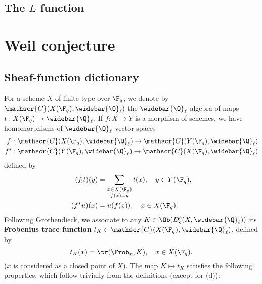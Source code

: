 \subsection{The \texorpdfstring{$L$}{L} function}

\section{Weil conjecture}
\subsection{Sheaf-function dictionary}\label{scheme sheaf-function dictionary subsection}
For a scheme $X$ of finite type over $\F_q$, we denote by $\mathscr{C}(X(\F_q),\widebar{\Q}_\ell)$ the $\widebar{\Q}_\ell$-algebra of maps $t:X(\F_q)\to\widebar{\Q}_\ell$. If $f:X\to Y$ is a morphism of schemes, we have homomorphisms of $\widebar{\Q}_\ell$-vector spaces
\begin{align*}
f_!&:\mathscr{C}(X(\F_q),\widebar{\Q}_\ell)\to \mathscr{C}(Y(\F_q),\widebar{\Q}_\ell)\\
f^*&:\mathscr{C}(Y(\F_q),\widebar{\Q}_\ell)\to \mathscr{C}(X(\F_q),\widebar{\Q}_\ell)
\end{align*}
defined by 
\begin{align*}
(f_!t)(y)&=\sum_{\substack{x\in X(\F_q)\\ f(x)=y}}t(x),\quad y\in Y(\F_q),\\
(f^*u)(x)&=u(f(x)),\quad x\in X(\F_q).
\end{align*}
Following Grothendieck, we associate to any $K\in\Ob(D^b_c(X,\widebar{\Q}_\ell))$ its \textbf{Frobenius trace function} $t_K\in\mathscr{C}(X(\F_q),\widebar{\Q}_\ell)$, defined by
\[t_K(x)=\tr(\Frob_x,K),\quad x\in X(\F_q).\]
($x$ is considered as a closed point of $X$). The map $K\mapsto t_K$ satisfies the following properties, which follow trivially from the definitions (except for (d)):
